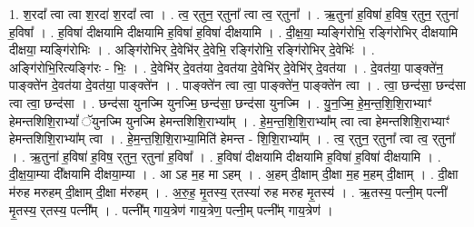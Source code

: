 \documentclass[17pt]{extarticle}
\begin{document}
1. श॒रदा᳚ त्वा त्वा श॒रदा॑ श॒रदा᳚ त्वा । . त्व॒ र्‌तुन॒ र्‌तुना᳚ त्वा त्व॒ र्‌तुना᳚ । . ऋ॒तुना॑ ह॒विषा॑ ह॒विष॒ र्‌तुन॒ र्‌तुना॑ ह॒विषा᳚ । . ह॒विषा॑ दीक्षयामि दीक्षयामि ह॒विषा॑ ह॒विषा॑ दीक्षयामि । . दी॒क्ष॒या॒ म्यङ्गि॑रोभि॒ रङ्गि॑रोभिर् दीक्षयामि दीक्षया॒ म्यङ्गि॑रोभिः । . अङ्गि॑रोभिर् दे॒वेभि॑र् दे॒वेभि॒ रङ्गि॑रोभि॒ रङ्गि॑रोभिर् दे॒वेभिः॑ । . अङ्गि॑रोभि॒रित्यङ्गि॑रः - भिः॒ । . दे॒वेभि॑र् दे॒वत॑या दे॒वत॑या दे॒वेभि॑र् दे॒वेभि॑र् दे॒वत॑या । . दे॒वत॑या॒ पाङ्क्ते॑न॒ पाङ्क्ते॑न दे॒वत॑या दे॒वत॑या॒ पाङ्क्ते॑न । . पाङ्क्ते॑न त्वा त्वा॒ पाङ्क्ते॑न॒ पाङ्क्ते॑न त्वा । . त्वा॒ छन्द॑सा॒ छन्द॑सा त्वा त्वा॒ छन्द॑सा । . छन्द॑सा युनज्मि युनज्मि॒ छन्द॑सा॒ छन्द॑सा युनज्मि । . यु॒न॒ज्मि॒ हे॒म॒न्त॒शि॒शि॒राभ्याꣳ॑ हेमन्तशिशि॒राभ्यां᳚ ॅयुनज्मि युनज्मि हेमन्तशिशि॒राभ्या᳚म् । . हे॒म॒न्त॒शि॒शि॒राभ्या᳚म् त्वा त्वा हेमन्तशिशि॒राभ्याꣳ॑ हेमन्तशिशि॒राभ्या᳚म् त्वा । . हे॒म॒न्त॒शि॒शि॒राभ्या॒मिति॑ हेमन्त - शि॒शि॒राभ्या᳚म् । . त्व॒ र्‌तुन॒ र्‌तुना᳚ त्वा त्व॒ र्‌तुना᳚ । . ऋ॒तुना॑ ह॒विषा॑ ह॒विष॒ र्‌तुन॒ र्‌तुना॑ ह॒विषा᳚ । . ह॒विषा॑ दीक्षयामि दीक्षयामि ह॒विषा॑ ह॒विषा॑ दीक्षयामि । . दी॒क्ष॒या॒म्या दी᳚क्षयामि दीक्षया॒म्या । . आ ऽह म॒ह मा ऽहम् । . अ॒हम् दी॒क्षाम् दी॒क्षा म॒ह म॒हम् दी॒क्षाम् । . दी॒क्षा म॑रुह मरुहम् दी॒क्षाम् दी॒क्षा म॑रुहम् । . अ॒रु॒ह॒ मृ॒तस्य॒ र्‌तस्या॑ रुह मरुह मृ॒तस्य॑ । . ऋ॒तस्य॒ पत्नी॒म् पत्नी॑ मृ॒तस्य॒ र्‌तस्य॒ पत्नी᳚म् । . पत्नी᳚म् गाय॒त्रेण॑ गाय॒त्रेण॒ पत्नी॒म् पत्नी᳚म् गाय॒त्रेण॑ । \newline
\end{document}
